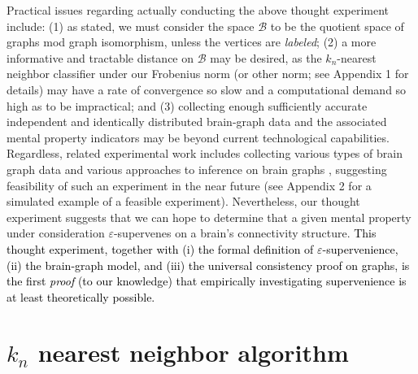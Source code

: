 \documentclass{article}
\newcommand{\mB}{\mathcal{B}}
\providecommand{\tr}[1]{\textcolor{black}{#1}}
\begin{document}
Practical issues regarding actually conducting the above thought experiment include: (1) as stated, we must consider the space $\mB$ to be the quotient space of graphs mod graph isomorphism, unless the vertices are {\it labeled}; (2) a more informative and tractable distance on $\mB$ may be desired, as the $k_n$-nearest neighbor classifier under our Frobenius norm (or other norm; see Appendix 1 for details) may have a rate of convergence so slow and a computational demand so high as to be impractical; and (3) collecting enough sufficiently accurate independent and identically distributed brain-graph data and the associated mental property indicators may be beyond current technological capabilities. Regardless, related experimental work includes collecting various types of brain graph data \cite{WhiteBrenner86, DenkHorstmann04, BriggmanDenk06} and various approaches to inference on brain graphs \cite{MackeBorst08, Mishchenko09, LuLichtman09}, suggesting feasibility of such an experiment in the near future (see Appendix 2 for a simulated example of a feasible experiment). Nevertheless, our thought experiment suggests that we can hope to determine that a given mental property under consideration $\varepsilon$-supervenes on a brain's connectivity structure. \tr{This thought experiment, together with (i) the formal definition of $\varepsilon$-supervenience, (ii) the brain-graph model, and (iii) the universal consistency proof on graphs, is the first \emph{proof} (to our knowledge) that empirically investigating supervenience is at least theoretically possible.}



\appendix
\section{$k_n$ nearest neighbor algorithm} %
\label{app:knn}
\end{document}
